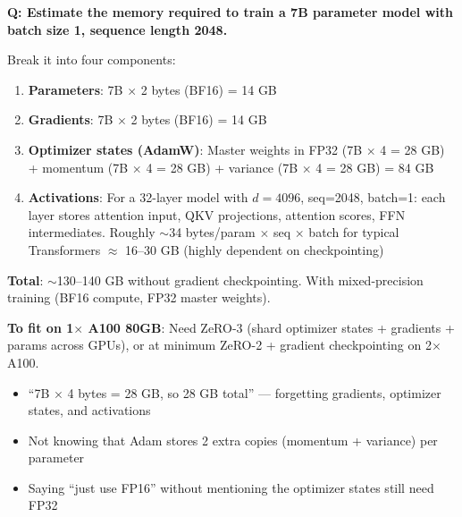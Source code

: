 \begin{interviewq}
\textbf{Q: Estimate the memory required to train a 7B parameter model with batch size 1, sequence length 2048.}

 \quad {} \quad \badgefreq{\freqhigh}

\stronganswer Break it into four components:

\begin{enumerate}
    \item \textbf{Parameters}: 7B $\times$ 2 bytes (BF16) = 14 GB
    \item \textbf{Gradients}: 7B $\times$ 2 bytes (BF16) = 14 GB
    \item \textbf{Optimizer states (AdamW)}: Master weights in FP32 (7B $\times$ 4 = 28 GB) + momentum (7B $\times$ 4 = 28 GB) + variance (7B $\times$ 4 = 28 GB) = 84 GB
    \item \textbf{Activations}: For a 32-layer model with $d=4096$, seq=2048, batch=1: each layer stores attention input, QKV projections, attention scores, FFN intermediates. Roughly $\sim$34 \textrm{bytes/param} $\times$ seq $\times$ batch for typical Transformers $\approx$ 16--30 GB (highly dependent on checkpointing)
\end{enumerate}

\textbf{Total}: $\sim$130--140 GB without gradient checkpointing. With mixed-precision training (BF16 compute, FP32 master weights).

\textbf{To fit on 1$\times$ A100 80GB}: Need ZeRO-3 (shard optimizer states + gradients + params across GPUs), or at minimum ZeRO-2 + gradient checkpointing on 2$\times$ A100.

\redflags
\begin{itemize}
    \item ``7B $\times$ 4 bytes = 28 GB, so 28 GB total'' --- forgetting gradients, optimizer states, and activations
    \item Not knowing that Adam stores 2 extra copies (momentum + variance) per parameter
    \item Saying ``just use FP16'' without mentioning the optimizer states still need FP32
\end{itemize}



\end{interviewq}
